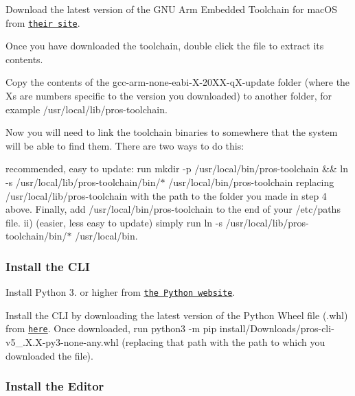 \begin{DoxyEnumerate}
\item Download the latest version of the G\+NU Arm Embedded Toolchain for mac\+OS from \href{https://developer.arm.com/open-source/gnu-toolchain/gnu-rm/downloads}{\tt their site}.
\item Once you have downloaded the toolchain, double click the file to extract its contents.
\item Copy the contents of the {\ttfamily gcc-\/arm-\/none-\/eabi-\/\+X-\/20\+X\+X-\/q\+X-\/update} folder (where the Xs are numbers specific to the version you downloaded) to another folder, for example {\ttfamily /usr/local/lib/pros-\/toolchain}.
\item Now you will need to link the toolchain binaries to somewhere that the system will be able to find them. There are two ways to do this\+:
\begin{DoxyItemize}
\item recommended, easy to update\+: run {\ttfamily mkdir -\/p /usr/local/bin/pros-\/toolchain \&\& ln -\/s /usr/local/lib/pros-\/toolchain/bin/$\ast$ /usr/local/bin/pros-\/toolchain} replacing {\ttfamily /usr/local/lib/pros-\/toolchain} with the path to the folder you made in step 4 above. Finally, add {\ttfamily /usr/local/bin/pros-\/toolchain} to the end of your {\ttfamily /etc/paths} file. ii) (easier, less easy to update) simply run {\ttfamily ln -\/s /usr/local/lib/pros-\/toolchain/bin/$\ast$ /usr/local/bin}.
\end{DoxyItemize}
\end{DoxyEnumerate}

\subsubsection*{Install the C\+LI}


\begin{DoxyEnumerate}
\item Install Python 3. or higher from \href{http://python.org}{\tt the Python website}.
\item Install the C\+LI by downloading the latest version of the Python Wheel file (.whl) from \href{https://github.com/purduesigbots/pros-cli3/releases/latest}{\tt here}. Once downloaded, run python3 -\/m pip install/\+Downloads/pros-\/cli-\/v5\+\_.\+X.\+X-\/py3-\/none-\/any.\+whl (replacing that path with the path to which you downloaded the file).
\end{DoxyEnumerate}

\subsubsection*{Install the Editor}

